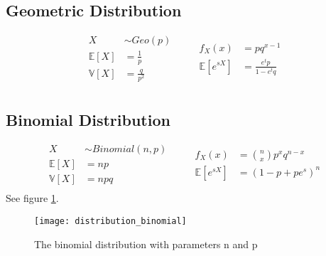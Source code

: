 \subsection{Geometric Distribution}
\begin{equation*}
    \begin{aligned}
        X &\sim Geo(p) \qquad\\
        \mathbb{E}[X] &= \frac{1}{p} \\
        \mathbb{V}[X] &= \frac{q}{p^2} \\
    \end{aligned}
    \begin{aligned}
        f_X(x) &= pq^{x-1}              \\
        \mathbb{E}[e^{sX}] &= \frac{e^tp}{1 - e^tq} \\
    \end{aligned}
\end{equation*}

\subsection{Binomial Distribution}
\begin{equation*}
    \begin{aligned}
        X &\sim Binomial(n, p) \qquad\\
        \mathbb{E}[X] &= np \\
        \mathbb{V}[X] &= npq \\
    \end{aligned}
    \begin{aligned}
        f_X(x) &= \binom{n}{x} p^x q^{n-x} \\
        \mathbb{E}[e^{sX}] &= (1 - p + pe^s)^n \\
    \end{aligned}
\end{equation*}
See figure \ref{fig:distribution_binomial}.
\begin{figure}[t]
    \centering
    \texttt{[image: distribution\_binomial]}
    \caption{The binomial distribution with parameters n and p}
    \label{fig:distribution_binomial}
\end{figure}

